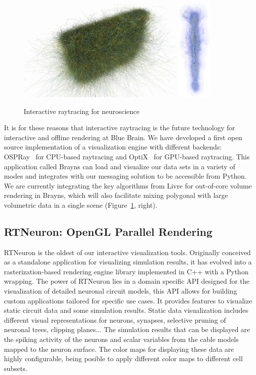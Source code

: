 \documentclass[10pt]{llncs}
\newcommand{\fig}[1]{Figure~\ref{#1}}
\begin{document}
\begin{figure}[ht]\center
  \includegraphics[height=5cm]{images/Brayns003}\hfil
  \includegraphics[height=5cm]{images/Brayns001}
  \caption{\label{fBrayns}Interactive raytracing for neuroscience}
\end{figure}

It is for these reasons that interactive raytracing is the future technology for
interactive and offline rendering at Blue Brain. We have developed a first open
source implementation of a visualization engine with different backends:
OSPRay~\cite{ospray} for CPU-based raytracing and OptiX~\cite{optix} for
GPU-based raytracing. This application called Brayns can load and visualize our
data sets in a variety of modes and integrates with our messaging solution to be
accessible from Python. We are currently integrating the key algorithms from
Livre for out-of-core volume rendering in Brayns, which will also facilitate
mixing polygonal with large volumetric data in a single scene (\fig{fBrayns},
right).

\subsection{RTNeuron: OpenGL Parallel Rendering}

RTNeuron is the oldest of our interactive visualization tools. Originally
conceived as a standalone application for visualizing simulation results, it
has evolved into a rasterization-based rendering engine library implemented in
C++ with a Python wrapping. The power of RTNeuron lies in a domain specific API
designed for the visualization of detailed neuronal circuit models, this API
allows for building custom applications tailored for specific use cases.
It provides features to visualize static circuit data and some simulation
results. Static data visualization includes different visual representations for
neurons, synapses, selective pruning of neuronal trees, clipping
planes... The simulation results that can be displayed are the spiking
activity of the neurons and scalar variables from the cable models mapped to
the neuron surface. The color maps for displaying these data are highly
configurable, being posible to apply different color maps to different cell
subsets.
\end{document}
